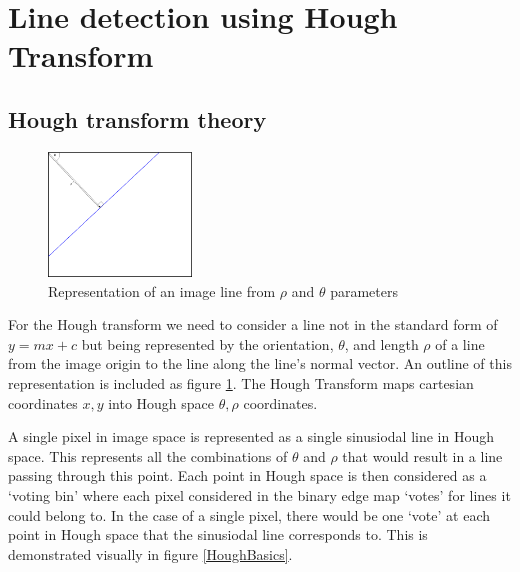 \documentclass{article}
\begin{document}
	
	\section{Line detection using Hough Transform}
	
	
	\subsection{Hough transform theory}	
	
	\begin{figure}
		\begin{center}
			\includegraphics[width=0.34\textwidth]{HoughLineSpace}
		\end{center}
		\caption{Representation of an image line from $\rho$ and $\theta$ parameters}
		\label{HoughLineSpace}
	\end{figure}

	For the Hough transform we need to consider a line not in the standard form of $y = mx + c$ but being represented by the orientation, $\theta$, and length $\rho$ of a line from the image origin to the line along the line's normal vector. An outline of this representation is included as figure \ref{HoughLineSpace}. The Hough Transform maps cartesian coordinates $x, y$ into Hough space $\theta , \rho$ coordinates. 
%	

	
	A single pixel in image space is represented as a single sinusiodal line in Hough space. This represents all the combinations of $\theta$ and $\rho$ that would result in a line passing through this point. Each point in Hough space is then considered as a `voting bin' where each pixel considered in the binary edge map `votes' for lines it could belong to. In the case of a single pixel, there would be one `vote' at each point in Hough space that the sinusiodal line corresponds to. This is demonstrated visually in figure \ref{HoughBasics}.
	
\end{document}
